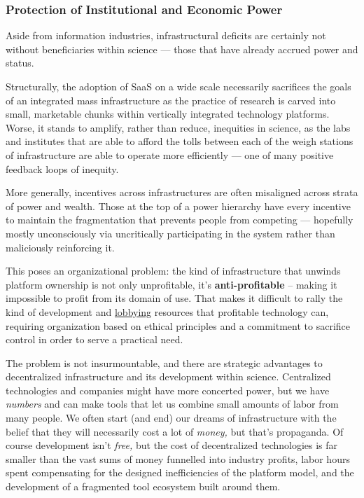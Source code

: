\documentclass[10pt]{article}
\begin{document}
\begin{multicols}{2}
\hypertarget{protection-of-institutional-and-economic-power}{%
\subsubsection{Protection of Institutional and Economic
Power}\label{protection-of-institutional-and-economic-power}}

Aside from information industries, infrastructural deficits are
certainly not without beneficiaries within science --- those that have
already accrued power and status.

Structurally, the adoption of SaaS on a wide scale necessarily
sacrifices the goals of an integrated mass infrastructure as the
practice of research is carved into small, marketable chunks within
vertically integrated technology platforms. Worse, it stands to amplify,
rather than reduce, inequities in science, as the labs and institutes
that are able to afford the tolls between each of the weigh stations of
infrastructure are able to operate more efficiently --- one of many
positive feedback loops of inequity.

More generally, incentives across infrastructures are often misaligned
across strata of power and wealth. Those at the top of a power hierarchy
have every incentive to maintain the fragmentation that prevents people
from competing --- hopefully mostly unconsciously via uncritically
participating in the system rather than maliciously reinforcing it.

This poses an organizational problem: the kind of infrastructure that
unwinds platform ownership is not only unprofitable, it's
\textbf{anti-profitable} -- making it impossible to profit from its
domain of use. That makes it difficult to rally the kind of development
and \href{https://www.snsi.info/}{lobbying} resources that profitable
technology can, requiring organization based on ethical principles and a
commitment to sacrifice control in order to serve a practical need.

The problem is not insurmountable, and there are strategic advantages to
decentralized infrastructure and its development within science.
Centralized technologies and companies might have more concerted power,
but we have \emph{numbers} and can make tools that let us combine small
amounts of labor from many people. We often start (and end) our dreams
of infrastructure with the belief that they will necessarily cost a lot
of \emph{money,} but that's propaganda. Of course development isn't
\emph{free,} but the cost of decentralized technologies is far smaller
than the vast sums of money funnelled into industry profits, labor hours
spent compensating for the designed inefficiencies of the platform
model, and the development of a fragmented tool ecosystem built around
them.


\end{multicols}
\end{document}
